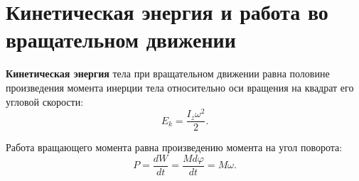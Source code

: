 \section[девятый вопрос]{Кинетическая энергия и работа во вращательном
движении}

\textbf{Кинетическая энергия} тела при вращательном движении равна половине
произведения момента инерции тела относительно оси вращения на квадрат его
угловой скорости: \[
  E_k = \frac{I_z \omega^2}{2}
.\]

Работа вращающего момента равна произведению момента на угол поворота: \[
  P = \frac{dW}{dt} = \frac{M d\varphi}{dt} = M \omega
.\]
